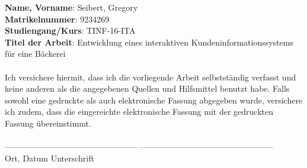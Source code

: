 \textbf{Name, Vorname}: Seibert, Gregory\\
\textbf{Matrikelnummer}: 9234269\\
\textbf{Studiengang/Kurs}: TINF-16-ITA\\
\textbf{Titel der Arbeit}: Entwicklung eines interaktiven Kundeninformationssystems für eine Bäckerei\\ \\
Ich versichere hiermit, dass ich die vorliegende Arbeit selbstständig verfasst und keine anderen als die angegebenen Quellen und Hilfsmittel benutzt habe. Falls sowohl eine gedruckte als auch elektronische Fassung abgegeben wurde, versichere ich zudem, dass die eingereichte elektronische Fassung mit der gedruckten Fassung übereinstimmt.\\ \\

------------------------------------------------ \hfill ------------------------------------------------ \\
Ort, Datum 				 	 \hfill Unterschrift